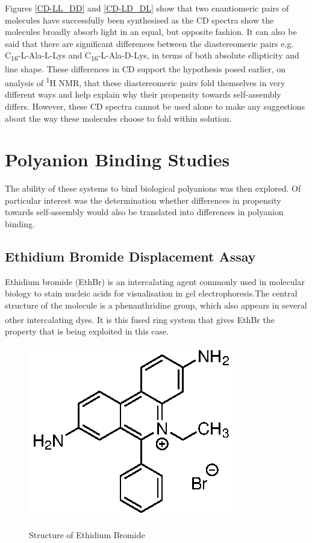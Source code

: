 Figures \ref{CD-LL_DD} and \ref{CD-LD_DL} show that two enantiomeric pairs of molecules have successfully been synthesised as the CD spectra show the molecules broadly absorb light in an equal, but opposite fashion. 
\newline
It can also be said that there are significant differences between the diastereomeric pairs e.g. C\textsubscript{16}-L-Ala-L-Lys and C\textsubscript{16}-L-Ala-D-Lys, in terms of both absolute ellipticity and line shape. These differences in CD support the hypothesis posed earlier, on analysis of \textsuperscript{1}H NMR, that these diastereomeric pairs fold themselves in very different ways and help explain why their propensity towards self-assembly differs. 
\newline
However, these CD spectra cannot be used alone to make any suggestions about the way these molecules choose to fold within solution.  

\newpage
\section{Polyanion Binding Studies}
The ability of these systems to bind biological polyanions was then explored. Of particular interest was the determination whether differences in propensity towards self-assembly would also be translated into differences in polyanion binding. 

\subsection{Ethidium Bromide Displacement Assay}
Ethidium bromide (EthBr) is an intercalating agent commonly used in molecular biology to stain nucleic acids for visualisation in gel electrophoresis.The central structure of the molecule is a phenanthridine group, which also appears in several other intercalating dyes.\textsuperscript{\cite{EthidiumbromideBioReagent-Sigma-AldrichHttp://www.sigmaaldrich.com/catalog/product/sigma/e7637}} It is this fused ring system that gives EthBr the property that is being exploited in this case. \newline
\begin{figure} [h!]
\centering
\includegraphics{Ethidium_Bromide/EtBr_structure.eps}
\caption{Structure of Ethidium Bromide}
\label{EthBr_structure}
\textsuperscript{\cite{EthidiumbromideBioReagent-Sigma-AldrichHttp://www.sigmaaldrich.com/catalog/product/sigma/e7637}} \end{figure}

